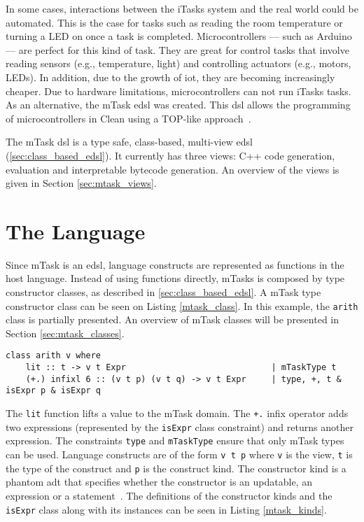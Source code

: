 In some cases, interactions between the iTasks system and the real world could be automated. This is the case for tasks such as reading the room temperature or turning a LED on once a task is completed. Microcontrollers --- such as Arduino --- are perfect for this kind of task. They are great for control tasks that involve reading sensors (e.g., temperature, light) and controlling actuators (e.g., motors, LEDs). In addition, due to the growth of \ac{iot}, they are becoming increasingly cheaper. Due to hardware limitations, microcontrollers can not run iTasks tasks. As an alternative, the mTask \ac{edsl} was created. This \ac{dsl} allows the programming of microcontrollers in Clean using a TOP-like approach~\cite{clean,mtasks,mtasks2,martthesis}.

The mTask \ac{dsl} is a type safe, class-based, multi-view \ac{edsl} (\autoref{sec:class_based_edsl}). It currently has three views: C++ code generation, evaluation and interpretable bytecode generation. An overview of the views is given in Section \ref{sec:mtask_views}.

\section{The Language}
Since mTask is an \ac{edsl}, language constructs are represented as functions in the host language. Instead of using functions directly, mTasks is composed by type constructor classes, as described in \autoref{sec:class_based_edsl}. A mTask type constructor class can be seen on Listing \ref{mtask_class}. In this example, the \texttt{arith} class is partially presented. An overview of mTask classes will be presented in Section \ref{sec:mtask_classes}.

\begin{lstlisting}[caption=A mTask class,captionpos=b,label=mtask_class]
class arith v where
    lit :: t -> v t Expr                             | mTaskType t                       
    (+.) infixl 6 :: (v t p) (v t q) -> v t Expr     | type, +, t & isExpr p & isExpr q
\end{lstlisting}

The \texttt{lit} function lifts a value to the mTask domain. The \texttt{+.} infix operator adds two expressions (represented by the \texttt{isExpr} class constraint) and returns another expression. The constraints \texttt{type} and \texttt{mTaskType} ensure that only mTask types can be used. Language constructs are of the form \texttt{v t p} where \texttt{v} is the view, \texttt{t} is the type of the construct and \texttt{p} is the construct kind. The constructor kind is a phantom \ac{adt} that specifies whether the constructor is an updatable, an expression or a statement~\cite{mtasks2}. The definitions of the constructor kinds and the \texttt{isExpr} class along with its instances can be seen in Listing \ref{mtask_kinds}.

